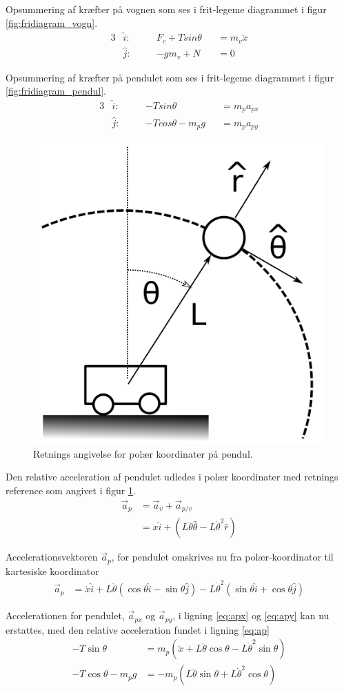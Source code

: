 Opsummering af kræfter på vognen som ses i frit-legeme diagrammet i figur \ref{fig:fridiagram_vogn}. 
\begin{alignat}{3}
&\hat{i} : \quad && F_c + T sin{\theta} && = m_v \ddot{x} \label{eq:vogn_x}\\
&\hat{j} : \quad && -g m_v + N && = 0 
\end{alignat}

Opsummering af kræfter på pendulet som ses i frit-legeme diagrammet i figur \ref{fig:fridiagram_pendul}.
\begin{alignat}{3}
&\hat{i} : \quad &&-T sin{\theta} &&= m_p a_{px}\label{eq:apx}\\
&\hat{j} : \quad &&-T cos{\theta} - m_p g &&= m_p a_{py}\label{eq:apy} 
\end{alignat}

\begin{figure}
	\centering
	\includegraphics[width=.3\textwidth]{billeder/pendul_vogn_polaer.png}
	\caption{Retnings angivelse for polær koordinater på pendul.}
	\label{fig:pendul_vogn_polaer}
\end{figure}

Den relative acceleration af pendulet udledes i polær koordinater med retnings reference som angivet i figur \ref{fig:pendul_vogn_polaer}. 
\begin{align}
\vec{a}_p &= \vec{a}_v + \vec{a}_{p/v} \\
&= \ddot{x} \hat{i} + \left( L\ddot{\theta}\hat{\theta} - L\dot{\theta}^2\hat{r} \right)
\end{align}

Accelerationsvektoren $\vec{a}_p$, for pendulet omskrives nu fra polær-koordinator til kartesiske koordinator  
\begin{align}
\vec{a}_p &=  \ddot{x} \hat{i} 
				+ L\ddot{\theta} \left( \cos{\theta}\hat{i} - \sin{\theta}\hat{j} \right) 
				- L\dot{\theta}^2 \left( \sin{\theta}\hat{i} + \cos{\theta}\hat{j} \right) \label{eq:ap}
\end{align} 

Accelerationen for pendulet, $\vec{a}_{px}$ og $\vec{a}_{py}$, i ligning \ref{eq:apx} og \ref{eq:apy} kan nu erstattes, med den relative acceleration fundet i ligning \ref{eq:ap}
\begin{align}
-T\sin{\theta} &= m_p \left( \ddot{x} + L\ddot{\theta}\cos{\theta} - L\dot{\theta}^2\sin{\theta} \right)  \label{eq:pendul_x2}\\
-T\cos{\theta} - m_p g &=  -m_p \left( L\ddot{\theta}\sin{\theta} + L\dot{\theta}^2\cos{\theta}  \right) \label{eq:pendul_y2}
\end{align} 

